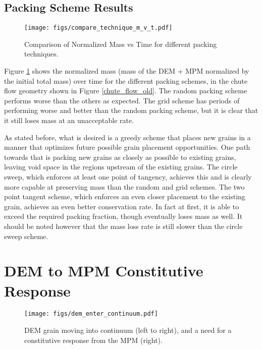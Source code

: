 \subsection{Packing Scheme Results}

\begin{figure}[htp] 
    \centering
    \texttt{[image: figs/compare\_technique\_m\_v\_t.pdf]}
    \caption{Comparison of Normalized Mass vs Time for different packing techniques.}
    \label{packing_compare}
\end{figure}

Figure \ref{packing_compare} shows the normalized mass (mass of the DEM + MPM normalized by the initial total mass) over time for the different packing schemes, in the chute flow geometry shown in Figure \ref{chute_flow_old}. The random packing scheme performs worse than the others as expected. The grid scheme has periods of performing worse and better than the random packing scheme, but it is clear that it still loses mass at an unacceptable rate.

As stated before, what is desired is a greedy scheme that places new grains in a manner that optimizes future possible grain placement opportunities. One path towards that is packing new grains as closely as possible to existing grains, leaving void space in the regions upstream of the existing grains. The circle sweep, which enforces at least one point of tangency, achieves this and is clearly more capable at preserving mass than the random and grid schemes. The two point tangent scheme, which enforces an even closer placement to the existing grain, achieves an even better conservation rate. In fact at first, it is able to exceed the required packing fraction, though eventually loses mass as well. It should be noted however that the mass loss rate is still slower than the circle sweep scheme.

\section{DEM to MPM Constitutive Response}
\begin{figure}[htp] 
    \centering
    \texttt{[image: figs/dem\_enter\_continuum.pdf]}
    \caption{DEM grain moving into continuum (left to right), and a need for a constitutive response from the MPM (right).}
    \label{lack_of_response}
\end{figure}

